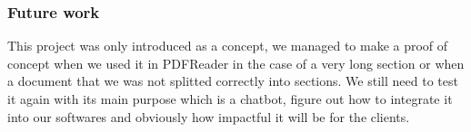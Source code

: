 \documentclass[a4paper,12pt,twoside]{report}
\begin{document}
\subsubsection{Future work}
This project was only introduced as a concept, we managed to make a proof of concept when we used it in PDFReader in the case of a very long section or when a document that we was not splitted correctly into sections. We still need to test it again with its main purpose which is a chatbot, figure out how to integrate it into our softwares and obviously how impactful it will be for the clients.
\printglossary[title=Glossary]




\appendix
\appendixpage
\addappheadtotoc
\end{document}
